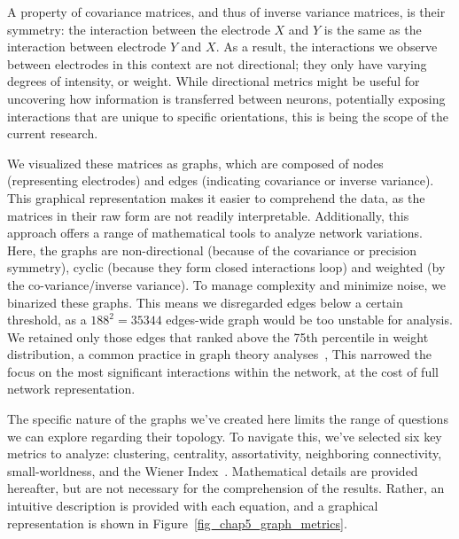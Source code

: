 A property of covariance matrices, and thus of inverse variance matrices, is their symmetry: the interaction between the electrode $X$ and $Y$ is the same as the interaction between electrode $Y$ and $X$. As a result, the interactions we observe between electrodes in this context are not directional; they only have varying degrees of intensity, or weight. While directional metrics might be useful for uncovering how information is transferred between neurons, potentially exposing interactions that are unique to specific orientations, this is being the scope of the current research.

We visualized these matrices as graphs, which are composed of nodes (representing electrodes) and edges (indicating covariance or inverse variance). This graphical representation makes it easier to comprehend the data, as the matrices in their raw form are not readily interpretable. Additionally, this approach offers a range of mathematical tools to analyze network variations. Here, the graphs are non-directional (because of the covariance or precision symmetry), cyclic (because they form closed interactions loop) and weighted (by the co-variance/inverse variance). 
To manage complexity and minimize noise, we binarized these graphs. This means we disregarded edges below a certain threshold, as a $188^2=35344$ edges-wide graph would be too unstable for analysis. We retained only those edges that ranked above the 75th percentile in weight distribution, a common practice in graph theory analyses~\cite{farahani2019application}, This narrowed the focus on the most significant interactions within the network, at the cost of full network representation.

The specific nature of the graphs we've created here limits the range of questions we can explore regarding their topology. To navigate this, we've selected six key metrics to analyze: clustering, centrality, assortativity, neighboring connectivity, small-worldness, and the Wiener Index~\cite{meunier2010modular,bullmore2012economy}. Mathematical details are provided hereafter, but are not necessary for the comprehension of the results. Rather, an intuitive description is provided with each equation, and a graphical representation is shown in Figure~\ref{fig_chap5_graph_metrics}.

